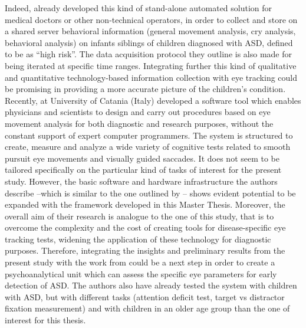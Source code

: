 Indeed, \cite{bocchi2012earlydiagnosis} already developed this kind of stand-alone automated solution for medical doctors or other non-technical operators, in order to collect and store on a shared server behavioral information (general movement analysis, cry analysis, behavioral analysis) on infants siblings of children diagnosed with ASD, defined to be as “high risk”. The data acquisition protocol they outline is also made for being iterated at specific time ranges. Integrating further this kind of qualitative and quantitative technology-based information collection with eye tracking could be promising in providing a more accurate picture of the children’s condition.\\
Recently, \cite{giordano2017eyetrackersystem} at University of Catania (Italy) developed a software tool which enables physicians and scientists to design and carry out procedures based on eye movement analysis for both diagnostic and research purposes, without the constant support of expert computer programmers. The system is structured to create, measure and analyze a wide variety of cognitive tests related to smooth pursuit eye movements and visually guided saccades. It does not seem to be tailored specifically on the particular kind of tasks of interest for the present study. However, the basic software and hardware infrastructure the authors describe –which is similar to the one outlined by \cite{subrahmaniam2013animation}– shows evident potential to be expanded with the framework developed in this Master Thesis. Moreover, the overall aim of their research is analogue to the one of this study, that is to overcome the complexity and the cost of creating tools for disease-specific eye tracking tests, widening the application of these technology for diagnostic purposes. Therefore, integrating the insights and preliminary results from the present study with the work from \cite{giordano2017eyetrackersystem} could be a next step in order to create a psychoanalytical unit which can assess the specific eye parameters for early detection of ASD. The authors also have already tested the system with children with ASD, but with different tasks (attention deficit test, target vs distractor fixation measurement) and with children in an older age group than the one of interest for this thesis.
